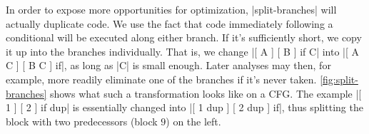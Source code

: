 
In order to expose more opportunities for optimization, \factor|split-branches|
will actually duplicate code.  We use the fact that code immediately following
a conditional will be executed along either branch.  If it's sufficiently
short, we copy it up into the branches individually.  That is, we change
%
\factor|[ A ] [ B ] if C|
%
into
%
\factor|[ A C ] [ B C ] if|,
%
as long as \factor|C| is small enough.  Later analyses may then, for example,
more readily eliminate one of the branches if it's never taken.
\vref{fig:split-branches} shows what such a transformation looks like on a
\gls{CFG}.  The example
%
\factor|[ 1 ] [ 2 ] if dup|
%
is essentially changed into
%
\factor|[ 1 dup ] [ 2 dup ] if|,
%
thus splitting the block with two predecessors (block $9$) on the left.












